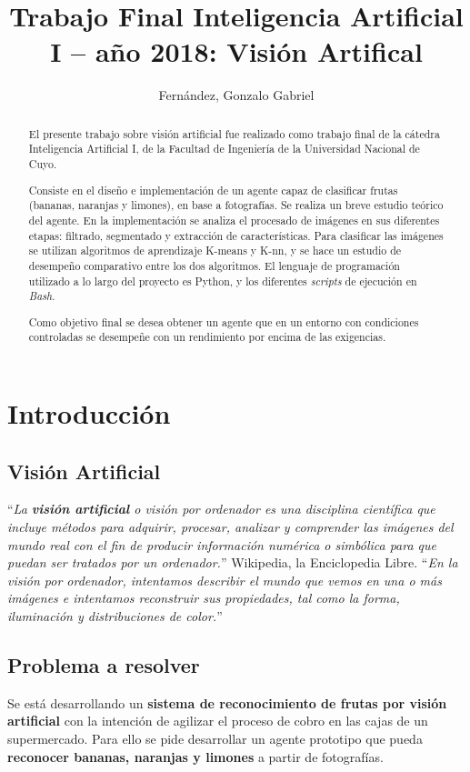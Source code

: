 \documentclass[10pt,a4paper]{article}
\author{Fernández, Gonzalo Gabriel}
\title{Trabajo Final Inteligencia Artificial I – año 2018: Visión Artifical}
\begin{document}
\maketitle

\begin{abstract}
El presente trabajo sobre visión artificial fue realizado como trabajo final de la cátedra Inteligencia Artificial I, de la Facultad de Ingeniería de la Universidad Nacional de Cuyo.

Consiste en el diseño e implementación de un agente capaz de clasificar frutas (bananas, naranjas y limones), en base a fotografías. Se realiza un breve estudio teórico del agente. En la implementación se analiza el procesado de imágenes en sus diferentes etapas: filtrado, segmentado y extracción de características. Para clasificar las imágenes se utilizan algoritmos de aprendizaje K-means y K-nn, y se hace un estudio de desempeño comparativo entre los dos algoritmos. El lenguaje de programación utilizado a lo largo del proyecto es Python, y los diferentes \textit{scripts} de ejecución en \textit{Bash}.

Como objetivo final se desea obtener un agente que en un entorno con condiciones controladas se desempeñe con un rendimiento por encima de las exigencias.
\end{abstract}

\section{Introducción}

\subsection{Visión Artificial\label{vision}}
``\textit{La \textbf{visión artificial} o visión por ordenador es una disciplina científica que incluye métodos para adquirir, procesar, analizar y comprender las imágenes del mundo real con el fin de producir información numérica o simbólica para que puedan ser tratados por un ordenador.}'' Wikipedia, la Enciclopedia Libre.
``\textit{En la visión por ordenador, intentamos describir el mundo que vemos en una o más imágenes e intentamos reconstruir sus propiedades, tal como la forma, iluminación y distribuciones de color.}'' \textcite{szeliski}

\subsection{Problema a resolver}
Se está desarrollando un \textbf{sistema de reconocimiento de frutas por visión artificial} con la intención de agilizar el proceso de cobro en las cajas de un supermercado. Para ello se
pide desarrollar un agente prototipo que pueda \textbf{reconocer bananas, naranjas y limones} a partir de fotografías.
\end{document}
